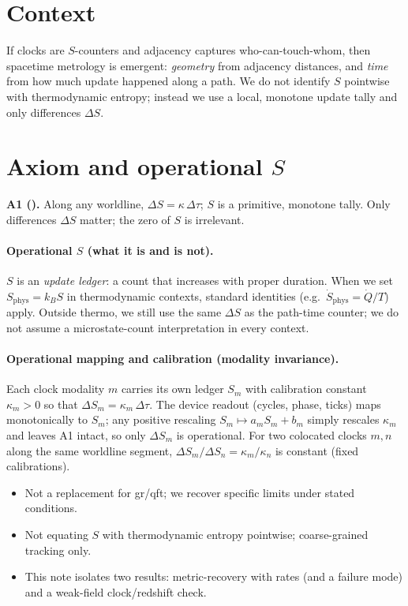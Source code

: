 \documentclass[11pt,a4paper]{article}
\begin{document}
\section*{Context}
If clocks are $S$-counters and adjacency captures who-can-touch-whom, then spacetime metrology is emergent: \emph{geometry} from adjacency distances, and \emph{time} from how much update happened along a path. We do not identify $S$ pointwise with thermodynamic entropy; instead we use a local, monotone update tally and only differences $\Delta S$.

\section[Axiom and operational S]{Axiom and operational \(S\)}
\textbf{A1 (\EtLaw).} Along any worldline, $\Delta S=\kappa\,\Delta\tau$; $S$ is a primitive, monotone tally. Only differences $\Delta S$ matter; the zero of $S$ is irrelevant.

\paragraph{Operational \(S\) (what it is and is not).}
$S$ is an \emph{update ledger}: a count that increases with proper duration. When we set $S_{\mathrm{phys}} = k_B S$ in thermodynamic contexts, standard identities (e.g.\ $\dot S_{\mathrm{phys}} = \dot Q/T$) apply. Outside thermo, we still use the same $\Delta S$ as the path-time counter; we do not assume a microstate-count interpretation in every context.

\paragraph{Operational mapping and calibration (modality invariance).}
Each clock modality \(m\) carries its own ledger \(S_m\) with calibration constant \(\kappa_m>0\) so that \(\Delta S_m=\kappa_m\,\Delta\tau\). The device readout (cycles, phase, ticks) maps monotonically to \(S_m\); any positive rescaling \(S_m\mapsto a_m S_m+b_m\) simply rescales \(\kappa_m\) and leaves A1 intact, so only \(\Delta S_m\) is operational. For two co\-located clocks \(m,n\) along the same worldline segment, \(\Delta S_m/\Delta S_n=\kappa_m/\kappa_n\) is constant (fixed calibrations).

\begin{nongoalsbox}
\begin{itemize}
  \item Not a replacement for \gls{gr}/\gls{qft}; we recover specific limits under stated conditions.
  \item Not equating $S$ with thermodynamic entropy pointwise; coarse-grained tracking only.
  \item This note isolates two results: metric-recovery with rates (and a failure mode) and a weak-field clock/redshift check.
\end{itemize}
\end{nongoalsbox}
\end{document}
